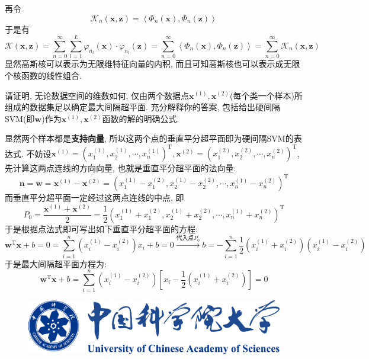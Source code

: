 \documentclass{article}
\begin{document}
\begin{homeworkProblem}
$$	$$
	再令
	$$
	\mathcal{K} _n\left( \boldsymbol{x},\boldsymbol{z} \right) =\left< \varPhi _n\left( \boldsymbol{x} \right) ,\varPhi _n\left( \boldsymbol{z} \right) \right> 
	$$
	于是有$$\mathcal{K} \left( \boldsymbol{x},\boldsymbol{z} \right) =\sum_{n=0}^{\infty}{\sum_{l=1}^L{\varphi _{n_l}\left( \boldsymbol{x} \right) \cdot \varphi _{n_l}\left( \boldsymbol{z} \right)}}=\sum_{n=0}^{\infty}{\left< \varPhi _n\left( \boldsymbol{x} \right) ,\varPhi _n\left( \boldsymbol{z} \right) \right>}=\sum_{n=0}^{\infty}{\mathcal{K} _n\left( \boldsymbol{x},\boldsymbol{z} \right)}
	$$
	显然高斯核可以表示为无限维特征向量的内积, 而且可知高斯核也可以表示成无限个核函数的线性组合.
\end{homeworkProblem}

\begin{homeworkProblem}
	请证明, 无论数据空间的维数如何, 仅由两个数据点$\boldsymbol{x}^{(1)},\boldsymbol{x}^{(2)}$(每个类一个样本)所组成的数据集足以确定最大间隔超平面. 充分解释你的答案, 包括给出硬间隔SVM(即$\boldsymbol{w}$)作为$\boldsymbol{x}^{(1)},\boldsymbol{x}^{(2)}$函数的解的明确公式.

	\solution 显然两个样本都是\textbf{支持向量}, 所以这两个点的垂直平分超平面即为硬间隔SVM的表达式. 不妨设$\boldsymbol{x}^{\left( 1 \right)}=\left( x_{1}^{\left( 1 \right)},x_{2}^{\left( 1 \right)},\cdots ,x_{n}^{\left( 1 \right)} \right) ^{\text{T}},\boldsymbol{x}^{\left( 2 \right)}=\left( x_{1}^{\left( 2 \right)},x_{2}^{\left( 2 \right)},\cdots ,x_{n}^{\left( 2 \right)} \right) ^{\text{T}}	$, 先计算这两点连线的方向向量, 也就是垂直平分超平面的法向量:
	$$
	\boldsymbol{n}=\boldsymbol{w}=\boldsymbol{x}^{\left( 1 \right)}-\boldsymbol{x}^{\left( 2 \right)}=\left( x_{1}^{\left( 1 \right)}-x_{1}^{\left( 2 \right)},x_{2}^{\left( 1 \right)}-x_{2}^{\left( 2 \right)},\cdots ,x_{n}^{\left( 1 \right)}-x_{n}^{\left( 2 \right)} \right) ^{\text{T}}
	$$
	而垂直平分超平面一定经过这两点连线的中点, 即$$\displaystyle P_0=\frac{\boldsymbol{x}^{\left( 1 \right)}+\boldsymbol{x}^{\left( 2 \right)}}{2}=\frac{1}{2}\left( x_{1}^{\left( 1 \right)}+x_{1}^{\left( 2 \right)},x_{2}^{\left( 1 \right)}+x_{2}^{\left( 2 \right)},\cdots ,x_{n}^{\left( 1 \right)}+x_{n}^{\left( 2 \right)} \right) ^{\text{T}}
	$$
	于是根据点法式即可写出如下垂直平分超平面的方程:
	$$\boldsymbol{w}^{\text{T}}\boldsymbol{x}+b=0=\sum_{i=1}^n{\left( x_{i}^{\left( 1 \right)}-x_{i}^{\left( 2 \right)} \right) x_i}+b=0\xrightarrow{\text{代入点}P_0}b=-\sum_{i=1}^n{\frac{1}{2}\left( x_{i}^{\left( 1 \right)}+x_{i}^{\left( 2 \right)} \right) \left( x_{i}^{\left( 1 \right)}-x_{i}^{\left( 2 \right)} \right)}
	$$
	于是最大间隔超平面方程为:
	$$
	\boldsymbol{w}^{\text{T}}\boldsymbol{x}+b=\sum_{i=1}^n{\left( x_{i}^{\left( 1 \right)}-x_{i}^{\left( 2 \right)} \right) \left[ x_i-\frac{1}{2}\left( x_{i}^{\left( 1 \right)}+x_{i}^{\left( 2 \right)} \right) \right]}=0
	$$
\end{homeworkProblem}

\begin{figure}[H]  %
	\centering
	\includegraphics[width=0.6\linewidth]{images/title/ucas_logo 1.pdf}
	\label{fig:ucas-logo}
\end{figure}

%
\end{document}
